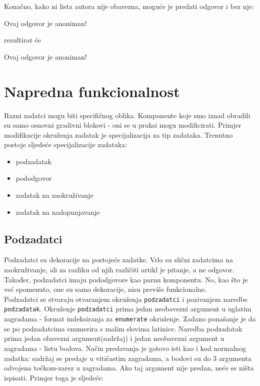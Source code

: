 \documentclass{studosi-workbook}
\begin{document}
	Konačno, kako ni lista autora nije obavezna, moguće je predati odgovor i bez nje:
	
	\begin{kod}
	\begin{odgovor}
		Ovaj odgovor je anoniman!
	\end{odgovor}
	\end{kod}
	
	rezultirat će
	
	\begin{odgovor}
		Ovaj odgovor je anoniman!
	\end{odgovor}
	\vspace{15pt}


	\section{Napredna funkcionalnost}
	Razni zadatci mogu biti specifičnog oblika. Komponente koje smo iznad obradili su samo osnovni gradivni blokovi - oni se u praksi mogu modificirati. Primjer modifikacije okruženja zadatak je specijalizacija za tip zadataka. Trenutno postoje sljedeće specijalizacije zadataka:
	
	\begin{itemize}
		\item podzadatak
		\item pododgovor
		\item zadatak na zaokruživanje
		\item zadatak na nadopunjavanje
	\end{itemize}

	\subsection{Podzadatci}
	Podzadatci su dekoracije na postojeće zadatke. Vrlo su slični zadatcima na zaokruživanje, ali za razliku od njih različiti artikl je pitanje, a ne odgovor. Također, podzadatci imaju pododgovore kao parnu komponentu. No, kao što je već spomenuto, one su samo dekoracije, nisu previše funkcionalne. \\
	
	Podzadatci se stvaraju otvaranjem okruženja \texttt{podzadatci} i pozivanjem naredbe \texttt{podzadatak}. Okruženje \texttt{podzadatci} prima jedan neobavezni argument u uglatim zagradama - format indeksiranja za \texttt{enumerate} okruženje. Zadano ponašanje je da se po podzadatcima enumerira s malim slovima latinice. Naredba podzadatak prima jedan obavezni argument(sadržaj) i jedan neobavezni argument u zagradama - listu bodova. Način predavanja je gotovo isti kao i kod normalnog zadatka: sadržaj se predaje u vitičastim zagradama, a bodovi su do 3 argumenta odvojena točkom-zarez u zagradama. Ako taj argument nije predan, neće se ništa ispisati. Primjer toga je sljedeće:
\end{document}

